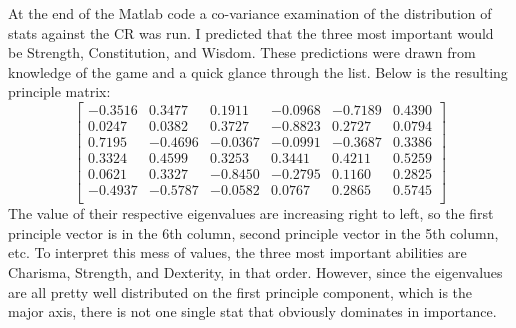 \documentclass{article}
\begin{document}
\par At the end of the Matlab code a co-variance examination of the distribution of stats against the CR was run. I predicted that the three most important would be Strength, Constitution, and Wisdom. These predictions were drawn from knowledge of the game and a quick glance through the list. Below is the resulting principle matrix:
$$\begin{bmatrix}
-0.3516& 0.3477& 0.1911&-0.0968&-0.7189& 0.4390\\
 0.0247& 0.0382& 0.3727&-0.8823& 0.2727& 0.0794\\
 0.7195&-0.4696&-0.0367&-0.0991&-0.3687& 0.3386\\
 0.3324& 0.4599& 0.3253& 0.3441& 0.4211& 0.5259\\
 0.0621& 0.3327&-0.8450&-0.2795& 0.1160& 0.2825\\
-0.4937&-0.5787&-0.0582& 0.0767& 0.2865& 0.5745\\
\end{bmatrix}$$
The value of their respective eigenvalues are increasing right to left, so the first principle vector is in the 6th column, second principle vector in the 5th column, etc. To interpret this mess of values, the three most important abilities are Charisma, Strength, and Dexterity, in that order. However, since the eigenvalues are all pretty well distributed on the first principle component, which is the major axis, there is not one single stat that obviously dominates in importance.
\end{document}
